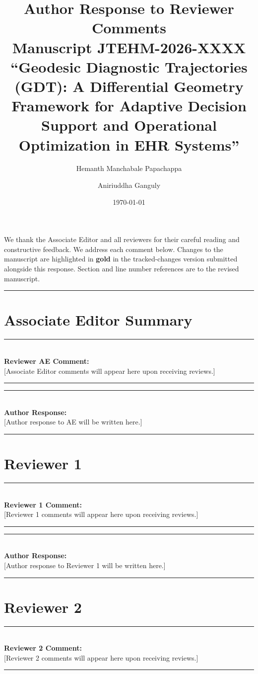 \documentclass[11pt]{article}
\title{Author Response to Reviewer Comments\\
\large Manuscript JTEHM-2026-XXXX\\
\normalsize ``Geodesic Diagnostic Trajectories (GDT): A Differential Geometry
Framework for Adaptive Decision Support and Operational Optimization in EHR
Systems''}
\author{Hemanth Manchabale Papachappa \and Aniriuddha Ganguly}
\date{\today}
\newenvironment{reviewercomment}[1]{%
  \vspace{0.5em}\noindent
  \textcolor{reviewerblue}{\rule{\linewidth}{1.5pt}}\\[0.2em]
  \noindent\textcolor{reviewerblue}{\textbf{Reviewer #1 Comment:}}\\
}{%
  \vspace{0.2em}\noindent\textcolor{reviewerblue}{\rule{\linewidth}{1.5pt}}\vspace{0.5em}
}
\newenvironment{authorresponse}{%
  \vspace{0.5em}\noindent
  \textcolor{responsegreen}{\rule{\linewidth}{1.5pt}}\\[0.2em]
  \noindent\textcolor{responsegreen}{\textbf{Author Response:}}\\
}{%
  \vspace{0.2em}\noindent\textcolor{responsegreen}{\rule{\linewidth}{1.5pt}}\vspace{1em}
}
\begin{document}
\maketitle

\noindent We thank the Associate Editor and all reviewers for their careful reading
and constructive feedback. We address each comment below. Changes to the manuscript
are highlighted in \textcolor{changedgold}{\textbf{gold}} in the tracked-changes
version submitted alongside this response. Section and line number references are
to the revised manuscript.

\bigskip
\noindent\rule{\textwidth}{0.4pt}

\section*{Associate Editor Summary}

\begin{reviewercomment}{AE}
[Associate Editor comments will appear here upon receiving reviews.]
\end{reviewercomment}

\begin{authorresponse}
[Author response to AE will be written here.]
\end{authorresponse}

\section*{Reviewer 1}

\begin{reviewercomment}{1}
[Reviewer 1 comments will appear here upon receiving reviews.]
\end{reviewercomment}

\begin{authorresponse}
[Author response to Reviewer 1 will be written here.]
\end{authorresponse}

\section*{Reviewer 2}

\begin{reviewercomment}{2}
[Reviewer 2 comments will appear here upon receiving reviews.]
\end{reviewercomment}
\end{document}
